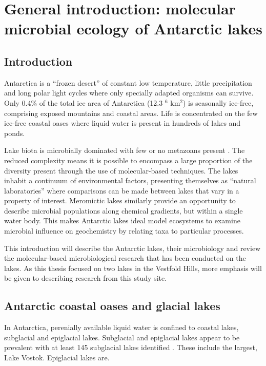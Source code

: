 \documentclass{book}
\begin{document}
\chapter{General introduction: molecular microbial ecology of Antarctic lakes}

\section{Introduction}
Antarctica is a ``frozen desert'' of constant low temperature, little precipitation and long polar light cycles where only specially adapted organisms can survive.
Only 0.4\% of the total ice area of Antarctica (12.3 $^6$ km$^2$) is seasonally ice-free, comprising exposed mountains and coastal areas. %
Life is concentrated on the few ice-free coastal oases where liquid water is present in hundreds of lakes and ponds.
 
Lake biota is microbially dominated with few or no metazoans present \cite{Laybourne-Parry1997}.
The reduced complexity means it is possible to encompass a large proportion of the diversity present through the use of molecular-based techniques.
The lakes inhabit a continuum of environmental factors, presenting themselves as ``natural laboratories'' where comparisons can be made between lakes that vary in a property of interest. 
Meromictic lakes similarly provide an opportunity to describe microbial populations along chemical gradients, but within a single water body. 
This makes Antarctic lakes ideal model ecosystems to examine microbial influence on geochemistry by relating taxa to particular processes\cite{Laybourne-Parry2007}.

This introduction will describe the Antarctic lakes, their microbiology and review the molecular-based microbiological research that has been conducted on the lakes.
As this thesis focused on two lakes in the Vestfold Hills, more emphasis will be given to describing research from this study site.

\section{Antarctic coastal oases and glacial lakes}
In Antarctica, perenially available liquid water is confined to coastal lakes, subglacial and epiglacial lakes.
Subglacial and epiglacial lakes appear to be prevalent with at least 145 subglacial lakes identified \cite{Siegert2005}.%
These include the largest, Lake Vostok. %
Epiglacial lakes are. %
\end{document}
